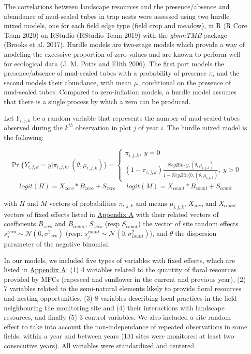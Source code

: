 \documentclass[smallextended]{svjour3}       %
\begin{document}
The correlations between landscape resources and the presence/absence
and abundance of mud-sealed tubes in trap nests were assessed using two
hurdle mixed models, one for each field edge type (field crop and
meadow), in R (R Core Team 2020) on RStudio (RStudio Team 2019) with the
\emph{glmmTMB} package (Brooks et al. 2017). Hurdle models are two-stage
models which provide a way of modeling the excessive proportion of zero
values and are known to perform well for ecological data (J. M. Potts
and Elith 2006). The first part models the presence/absence of
mud-sealed tubes with a probability of presence \(\pi\), and the second
models their abundance, with mean \(\mu\), conditional on the presence
of mud-sealed tubes. Compared to zero-inflation models, a hurdle model
assumes that there is a single process by which a zero can be produced.

\bigbreak

Let \(Y_{i,j,k}\) be a random variable that represents the number of
mud-sealed tubes observed during the \(k^{th}\) observation in plot
\(j\) of year \(i\). The hurdle mixed model is the following:

\begin{equation*}
\Pr\{Y_{i,j,k} = y | \pi_{i,j,k},(\theta, \mu_{i,j,k}) \} = \begin{cases} 
    \pi_{i,j,k}, \; y = 0 \\   
    (1-\pi_{i,j,k}) \frac{NegBin\{ y, (\theta, \mu_{i,j,k})}{1-NegBin\{0, (\theta, \mu_{i,j,k})}, \; y > 0
\end{cases} 
\end{equation*} \begin{align*}
logit(\Pi)=X_{zero}*B_{zero}+S_{zero} 
&&
logit(M)=X_{count}*B_{count}+S_{count} 
\end{align*}

with \(\Pi\) and \(M\) vectors of probabilities \(\pi_{i,j,k}\) and
means \(\mu_{i,j,k}\), \(X_{zero}\) and \(X_{count}\) vectors of fixed
effects listed in \hyperlink{appendix-a}{Appendix A} with their related
vectors of coefficients \(B_{zero}\) and \(B_{count}\), \(S_{zero}\)
(resp \(S_{count}\)) the vector of site random effects
\(s_j^{zero} \sim \mathcal{N}(0, \sigma_{zero}^2)\) (resp.
\(s_j^{count} \sim \mathcal{N}(0, \sigma_{count}^2)\)), and \(\theta\)
the dispersion parameter of the negative binomial.

\medbreak

In our models, we included five types of variables with fixed effects,
which are listed in \hyperlink{appendix-a}{Appendix A}: (1) 4 variables
related to the quantity of floral resources provided by MFCs (rapeseed
and sunflower in the current and previous year), (2) 7 variables related
to the semi-natural elements likely to provide floral resources and
nesting opportunities, (3) 8 variables describing local practices in the
field neighbouring the monitoring site and (4) their interactions with
landscape resources, and finally (5) 3 control variables. We also
included a site random effect to take into account the non-independance
of repeated observations in some fields, within a year and between years
(131 sites were monitored at least two consecutive years). All variables
were standardized and centered.
\end{document}

